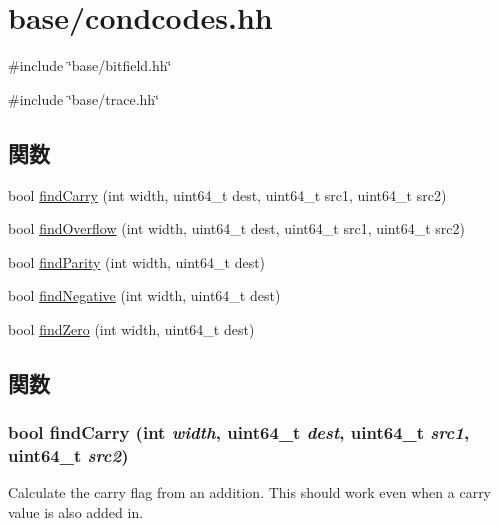 \hypertarget{condcodes_8hh}{
\section{base/condcodes.hh}
\label{condcodes_8hh}
}
{\ttfamily \#include \char`\"{}base/bitfield.hh\char`\"{}}\par
{\ttfamily \#include \char`\"{}base/trace.hh\char`\"{}}\par
\subsection*{関数}
\begin{DoxyCompactItemize}
\item 
bool \hyperlink{condcodes_8hh_af1b1c69a86b8cee6804f7df3ccfeea1e}{findCarry} (int width, uint64\_\-t dest, uint64\_\-t src1, uint64\_\-t src2)
\item 
bool \hyperlink{condcodes_8hh_ab8af463ce20b2c4519622e1c79100057}{findOverflow} (int width, uint64\_\-t dest, uint64\_\-t src1, uint64\_\-t src2)
\item 
bool \hyperlink{condcodes_8hh_a8b5d8a69b154bcb06d1fef2db3ed24c7}{findParity} (int width, uint64\_\-t dest)
\item 
bool \hyperlink{condcodes_8hh_a43e1d3b7ba28675edcf5c15acb397516}{findNegative} (int width, uint64\_\-t dest)
\item 
bool \hyperlink{condcodes_8hh_ac6d1aef2bae3d34668b695f62ed7bace}{findZero} (int width, uint64\_\-t dest)
\end{DoxyCompactItemize}


\subsection{関数}
\hypertarget{condcodes_8hh_af1b1c69a86b8cee6804f7df3ccfeea1e}{
\subsubsection[{findCarry}]{\setlength{\rightskip}{0pt plus 5cm}bool findCarry (int {\em width}, \/  uint64\_\-t {\em dest}, \/  uint64\_\-t {\em src1}, \/  uint64\_\-t {\em src2})}}
\label{condcodes_8hh_af1b1c69a86b8cee6804f7df3ccfeea1e}
Calculate the carry flag from an addition. This should work even when a carry value is also added in. 


